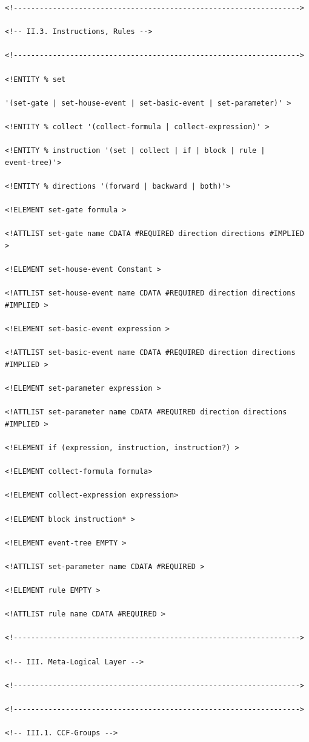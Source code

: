 \documentclass[11pt]{article}
\begin{document}
\begin{lstlisting}
<!------------------------------------------------------------------>

<!-- II.3. Instructions, Rules -->

<!------------------------------------------------------------------>

<!ENTITY % set

'(set-gate | set-house-event | set-basic-event | set-parameter)' >

<!ENTITY % collect '(collect-formula | collect-expression)' >

<!ENTITY % instruction '(set | collect | if | block | rule |
event-tree)'>

<!ENTITY % directions '(forward | backward | both)'>

<!ELEMENT set-gate formula >

<!ATTLIST set-gate name CDATA #REQUIRED direction directions #IMPLIED >

<!ELEMENT set-house-event Constant >

<!ATTLIST set-house-event name CDATA #REQUIRED direction directions
#IMPLIED >

<!ELEMENT set-basic-event expression >

<!ATTLIST set-basic-event name CDATA #REQUIRED direction directions
#IMPLIED >

<!ELEMENT set-parameter expression >

<!ATTLIST set-parameter name CDATA #REQUIRED direction directions
#IMPLIED >

<!ELEMENT if (expression, instruction, instruction?) >

<!ELEMENT collect-formula formula>

<!ELEMENT collect-expression expression>

<!ELEMENT block instruction* >

<!ELEMENT event-tree EMPTY >

<!ATTLIST set-parameter name CDATA #REQUIRED >

<!ELEMENT rule EMPTY >

<!ATTLIST rule name CDATA #REQUIRED >

<!------------------------------------------------------------------>

<!-- III. Meta-Logical Layer -->

<!------------------------------------------------------------------>

<!------------------------------------------------------------------>

<!-- III.1. CCF-Groups -->


\end{lstlisting}
\end{document}
